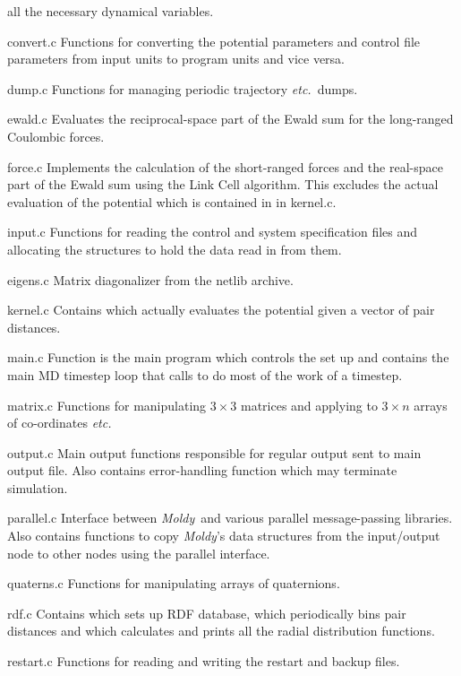 \documentclass[a4paper,twoside]{report}
\newcommand{\Fname}[1]{{\upshape\mdseries\sffamily#1}}
\newenvironment{Fndescription}{\begingroup%
     \renewcommand{\descriptionlabel}[1]{\Fname{##1}}\begin{description}}%
     {\end{description}\endgroup}
\newcommand{\moldy}{\emph{Moldy}}
\newcommand{\etc}{\emph{etc.}}
\begin{document}
\begin{Fndescription}
  all the necessary dynamical variables.
\item[convert.c] Functions for converting the potential parameters and
  control file parameters from input units to program units and vice
  versa. 
\item[dump.c] Functions for managing periodic trajectory \etc\ dumps.
\item[ewald.c] Evaluates the reciprocal-space part of the Ewald sum
  for the long-ranged Coulombic forces.
\item[force.c] Implements the calculation of the short-ranged forces
  and the real-space part of the Ewald sum using the Link Cell
  algorithm. This excludes the actual evaluation of the potential
  which is contained in  in \Fname{kernel.c}.
\item[input.c] Functions for reading the control and system
  specification files and allocating the structures to hold the data
  read in from them. 
\item[eigens.c] Matrix diagonalizer from the netlib archive.
\item[kernel.c] Contains  which actually evaluates
  the potential given a vector of pair distances.
\item[main.c] Function  is the main program which
  controls the set up and contains the main MD timestep loop that 
  calls  to do most of the work of a timestep.
\item[matrix.c] Functions for manipulating $3 \times 3$ matrices and
  applying to $3 \times n$ arrays of co-ordinates \etc
\item[output.c] Main output functions responsible for regular output
  sent to main output file.  Also contains error-handling function
   which may terminate simulation.
\item[parallel.c] Interface between \moldy\ and various parallel
  message-passing libraries.  Also contains functions to copy \moldy's
  data structures from the input/output node to other nodes using the
  parallel interface.
\item[quaterns.c] Functions for manipulating arrays of quaternions.
\item[rdf.c] Contains  which sets up RDF database,
   which periodically bins pair distances and
   which calculates and prints all the radial
  distribution functions.
\item[restart.c] Functions for reading and writing the restart and
  backup files.

\end{Fndescription}
\end{document}
